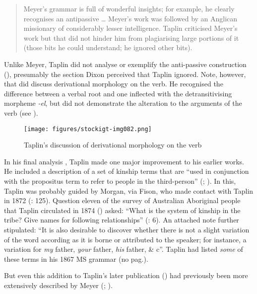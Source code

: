 \begin{quote}
Meyer’s grammar is full of wonderful insights; for example, he clearly recognises an antipassive … Meyer’s work was followed by \citet{taplin_1879a_nodate} an Anglican missionary of considerably lesser intelligence. Taplin criticised Meyer’s work but that did not hinder him from plagiarising large portions of it (those bits he could understand; he ignored other bits). \citep[7]{dixon_australian_2002}
\end{quote}

Unlike Meyer, Taplin did not analyse or exemplify the anti-passive construction (), presumably the section Dixon perceived that Taplin ignored. Note, however, that \citet[19]{taplin_grammar_1878} did discuss derivational morphology on the verb. He recognised the difference between a verbal root and one inflected with the detransitivising morpheme \textit{-el}, but did not demonstrate the alteration to the arguments of the verb (see ).


\begin{figure}
\texttt{[image: figures/stockigt-img082.png]}
\caption{Taplin’s discussion of derivational morphology on the verb \citeyearpar[19]{taplin_grammar_1878}}
\label{bkm:Ref456016347}
\label{fig:key:7-135}
\end{figure}

In his final analysis \citeyearpar{taplin_grammar_1878}, Taplin made one major improvement to his earlier works. He included a description of a set of kinship terms that are “used in conjunction with the propositus term to refer to people in the third-person” (\citealt[304–305]{GabySinger2014}; ). In this, Taplin was probably guided by Morgan, via Fison, who made contact with Taplin in 1872 (\citealt{gardner_southern_2015}: 125). Question eleven of the survey of Australian Aboriginal people that Taplin circulated in 1874 () asked: “What is the system of kinship in the tribe? Give names for following relationships” (\citeyear{taplin_1879a_nodate}: 6). An attached note further stipulated: “It is also desirable to discover whether there is not a slight variation of the word according as it is borne or attributed to the speaker; for instance, a variation for \textit{my} father, \textit{your} father, \textit{his} father, \& c”. Taplin had listed \textit{some} of these terms in his 1867 MS grammar (no pag.).

But even this addition to Taplin’s later publication () had previously been more extensively described by Meyer (\citeyear[11, 34--36]{meyer_vocabulary_1843}; ).


